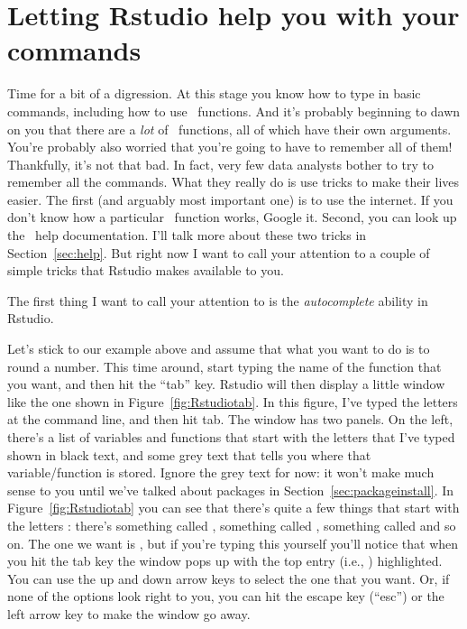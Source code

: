 \section{Letting Rstudio help you with your commands\label{sec:Rstudio1}}

Time for a bit of a digression. At this stage you know how to type in basic commands, including how to use \R\ functions. And it's probably beginning to dawn on you that there are a {\it lot} of \R\ functions, all of which have their own arguments. You're probably also worried that you're going to have to remember all of them! Thankfully, it's not that bad. In fact, very few data analysts bother to try to remember all the commands. What they really do is use tricks to make their lives easier. The first (and arguably most important one) is to use the internet. If you don't know how a particular \R\ function works, Google it. Second, you can look up the \R\ help documentation. I'll talk more about these two tricks in Section~\ref{sec:help}. But right now I want to call your attention to a couple of simple tricks that Rstudio makes available to you.


The first thing I  want to call your attention to is the {\it autocomplete} ability in Rstudio.

Let's stick to our example above and assume that what you want to do is to round a number. This time around, start typing the name of the function that you want, and then hit the ``tab'' key. Rstudio will then display a little window like the one shown in Figure~\ref{fig:Rstudiotab}. In this figure, I've typed the letters  at the command line, and then hit tab. The window has two panels. On the left, there's a list of variables and functions that start with the letters that I've typed shown in black text, and some grey text that tells you where that variable/function is stored. Ignore the grey text for now: it won't make much sense to you until we've talked about packages in Section~\ref{sec:packageinstall}. In Figure~\ref{fig:Rstudiotab} you can see that there's quite a few things that start with the letters : there's something called , something called , something called  and so on. The one we want is , but if you're typing this yourself you'll notice that when you hit the tab key the window pops up with the top entry (i.e., ) highlighted. You can use the up and down arrow keys to select the one that you want. Or, if none of the options look right to you, you can hit the escape key (``esc'') or the left arrow key to make the window go away. 

